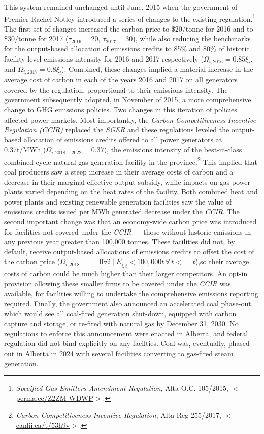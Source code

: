 \documentclass[12pt]{article}
\begin{document}
This system remained unchanged until June, 2015 when the government of Premier Rachel Notley introduced a series of changes to the existing regulation.\footnote{\textit{Specified Gas Emitters Amendment Regulation}, Alta O.C. 105/2015, $<$\url{perma.cc/Z2ZM-WDWP}$>$.} The first set of changes increased the carbon price to \$20/tonne for 2016 and to \$30/tonne for 2017 ($\tau_{2016}=20$, $\tau_{2017}=30$), while also reducing the benchmarks for the output-based allocation of emissions credits to 85\% and 80\% of historic facility level emissions intensity for 2016 and 2017 respectively ($\Omega_{i,2016}=0.85\xi_i$, and $\Omega_{i,2017}=0.8\xi_i$). Combined, these changes implied a material increase in the average cost of carbon in each of the years 2016 and 2017 on all generators covered by the regulation, proportional to their emissions intensity. The government subsequently adopted, in November of 2015, a more comprehensive change to GHG emissions policies. Two changes in this iteration of policies affected power markets. Most importantly, the \textit{Carbon Competitiveness Incentive Regulation (CCIR)} replaced the \emph{SGER} and these regulations leveled the output-based allocation of emissions credits offered to all power generators at 0.37t/MWh ($\Omega_{i,2018-2022}=0.37$), the emissions intensity of the best-in-class combined cycle natural gas generation facility in the province.\footnote{\textit{Carbon Competitiveness Incentive Regulation}, Alta Reg 255/2017, $<$\url{canlii.ca/t/53h9v}$>$.} This implied that coal producers saw a steep increase in their average costs of carbon and a decrease in their marginal effective output subsidy, while impacts on gas power plants varied depending on the heat rates of the facility. Both combined heat and power plants and existing renewable generation facilities saw the value of emissions credits issued per MWh generated decrease under the \emph{CCIR}. The second important change was that an economy-wide carbon price was introduced for facilities not covered under the \emph{CCIR} --- those without historic emissions in any previous year greater than 100,000 tonnes. These facilities did not, by default, receive output-based allocations of emissions credits to offset the cost of the carbon price ($\Omega_{i,2018-...}=0  \forall i \mid E_{i,\tilde{t}} <100,000 t\, \forall\, \tilde{t} <=t$),so their average costs of carbon could be much higher than their larger competitors. An opt-in provision allowing these smaller firms to be covered under the \emph{CCIR} was available, for facilities willing to undertake the comprehensive emissions reporting required. Finally, the government also announced an accelerated coal phase-out which would see all coal-fired generation shut-down, equipped with carbon capture and storage, or re-fired with natural gas by December 31, 2030. No regulations to enforce this announcement were enacted in Alberta, and federal regulation did not bind explicitly on any facilties. Coal was, eventually, phased-out in Alberta in 2024 with several facilities converting to gas-fired steam generation.
\end{document}
